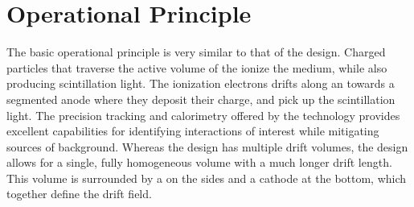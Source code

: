 
\section{\dual \lartpc Operational Principle}
\label{sec:fddp-operational-principle}


The basic operational principle is very similar to that of the \single design. 
Charged particles that traverse the active volume of the \lartpc ionize the medium, while also producing scintillation light.  The ionization electrons drifts along an \efield towards a segmented anode where they deposit their charge, and  pick up the scintillation light.
The precision tracking and calorimetry offered by the \dual
technology provides excellent capabilities for identifying interactions of interest while mitigating sources of background.  
Whereas the \single design has multiple drift volumes, the  design allows for a single, fully homogeneous \lar volume with a much longer drift length. This volume is surrounded by a  on the sides and a cathode at the bottom, which together define the drift field. 



